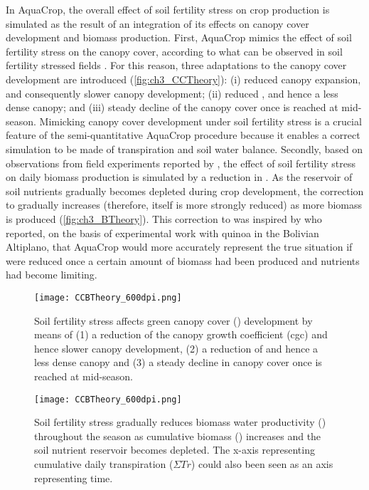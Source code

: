 In AquaCrop, the overall effect of soil fertility stress on crop production is simulated as the result of an integration of its effects on canopy cover development and biomass production.  First, AquaCrop mimics the effect of soil fertility stress on the canopy cover, according to what can be observed in soil fertility stressed fields \parencite{walburg1981,albrizio2005}. For this reason, three adaptations to the canopy cover development are introduced (\autoref{fig:ch3_CCTheory}): (i) reduced canopy expansion, and consequently slower canopy development; (ii) reduced \CCx, and hence a less dense canopy; and (iii) steady decline of the canopy cover once \CCx is reached at mid-season. Mimicking canopy cover development under soil fertility stress is a crucial feature of the semi-quantitative AquaCrop procedure because it enables a correct simulation to be made of transpiration and soil water balance. Secondly, based on observations from field experiments reported by \textcite{steduto2005}, the effect of soil fertility stress on daily biomass production is simulated by a reduction in \WPster. As the reservoir of soil nutrients gradually becomes depleted during crop development, the correction to \WPster gradually increases (therefore, \WPster itself is more strongly reduced) as more biomass is produced (\autoref{fig:ch3_BTheory}). This correction to \WPster was inspired by \textcite{geerts2008f} who reported, on the basis of experimental work with quinoa in the Bolivian Altiplano, that AquaCrop would more accurately represent the true situation if \WPster were reduced once a certain amount of biomass had been produced and nutrients had become limiting. 

\begin{figure}[tbhp]
	\centering
		\texttt{[image: CCBTheory\_600dpi.png]}
	\caption{Soil fertility stress affects green canopy cover (\CC) development by means of (1) a reduction of the canopy growth coefficient (cgc) and hence slower canopy development, (2) a reduction of \CCx and hence a less dense canopy and (3) a steady decline in canopy cover once \CCx is reached at mid-season.}
	\label{fig:ch3_CCTheory}
\end{figure}

\begin{figure}[tbhp]
	\centering
		\texttt{[image: CCBTheory\_600dpi.png]}
	\caption{Soil fertility stress gradually reduces biomass water productivity (\WPster) throughout the season as cumulative biomass (\B) increases and the soil nutrient reservoir becomes depleted. The x-axis representing cumulative daily transpiration ($\Sigma Tr$) could also been seen as an axis representing time.}
	\label{fig:ch3_BTheory}
\end{figure}

